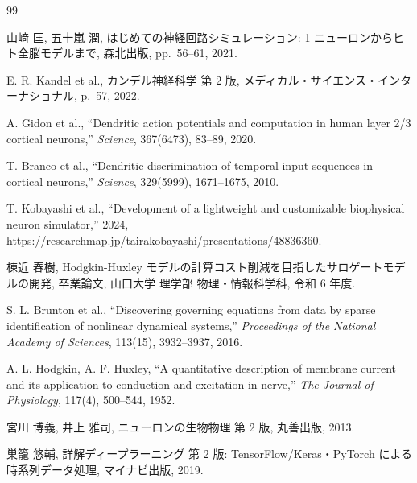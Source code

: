 \documentclass[a4paper,11pt,openany]{ltjsreport}
\newcommand{\TODO}[1]{\textcolor{red}{\textbf{[TODO: #1]}}}
\begin{document}
\begin{thebibliography}{99}

山﨑 匡, 五十嵐 潤,
はじめての神経回路シミュレーション: 1 ニューロンからヒト全脳モデルまで,
森北出版, pp.~56--61, 2021.

E. R. Kandel et al.,
カンデル神経科学 第 2 版,
メディカル・サイエンス・インターナショナル, p.~57, 2022.

A. Gidon et al.,
``Dendritic action potentials and computation in human layer 2/3 cortical neurons,''
\textit{Science}, 367(6473), 83--89, 2020.

T. Branco et al.,
``Dendritic discrimination of temporal input sequences in cortical neurons,''
\textit{Science}, 329(5999), 1671--1675, 2010.

T. Kobayashi et al.,
``Development of a lightweight and customizable biophysical neuron simulator,''
2024, \url{https://researchmap.jp/tairakobayashi/presentations/48836360}.

棟近 春樹,
Hodgkin-Huxley モデルの計算コスト削減を目指したサロゲートモデルの開発,
卒業論文, 山口大学 理学部 物理・情報科学科, 令和 6 年度.

S. L. Brunton et al.,
``Discovering governing equations from data by sparse identification of
nonlinear dynamical systems,''
\textit{Proceedings of the National Academy of Sciences}, 113(15), 3932--3937, 2016.

A. L. Hodgkin, A. F. Huxley,
``A quantitative description of membrane current and its application to
conduction and excitation in nerve,''
\textit{The Journal of Physiology}, 117(4), 500--544, 1952.

宮川 博義, 井上 雅司,
ニューロンの生物物理 第 2 版,
丸善出版, 2013.

巣籠 悠輔,
詳解ディープラーニング 第 2 版: TensorFlow/Keras・PyTorch による時系列データ処理,
マイナビ出版, 2019.


\end{thebibliography}
\end{document}
